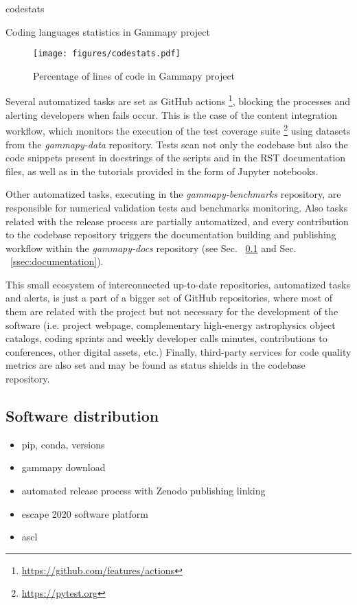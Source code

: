 \begin{table}
	{codestats}
	\caption{Coding languages statistics in Gammapy project}
	\label{table:codestats:data}
\end{table}

\begin{figure}[t]
	\centering
	\texttt{[image: figures/codestats.pdf]}
	\caption{
		Percentage of lines of code in Gammapy project} \label{fig:codestats:lang}
\end{figure}

Several automatized tasks are set as GitHub actions \footnote{\url{https://github.com/features/actions}}, blocking the processes and alerting developers when fails occur. This is the case of the content integration workflow, which monitors the execution of the test coverage suite \footnote{\url{https://pytest.org}} using datasets from the \textit{gammapy-data} repository. Tests scan not only the codebase but also the code snippets present in docstrings of the scripts and in the RST documentation files, as well as in the tutorials provided in the form of Jupyter notebooks. 

Other automatized tasks, executing in the \textit{gammapy-benchmarks} repository, are responsible for numerical validation tests and benchmarks monitoring. Also tasks related with the release process are partially automatized, and every contribution to the codebase repository triggers the documentation building and publishing workflow within the \textit{gammapy-docs} repository (see Sec. ~\ref{ssec:software-distribution} and Sec. ~\ref{ssec:documentation}).

This small ecosystem of interconnected up-to-date repositories, automatized tasks and alerts, is just a part of a bigger set of GitHub repositories, where most of them are related with the project but not necessary for the development of the software (i.e. project webpage, complementary high-energy astrophysics object catalogs, coding sprints and weekly developer calls minutes, contributions to conferences, other digital assets, etc.) Finally, third-party services for code quality metrics are also set and may be found as status shields in the codebase repository.

\subsection{Software distribution}
\label{ssec:software-distribution}

\begin{itemize}
	\item pip, conda, versions
	\item gammapy download
	\item automated release process with Zenodo publishing linking
	\item escape 2020 software platform
	\item ascl
\end{itemize}

